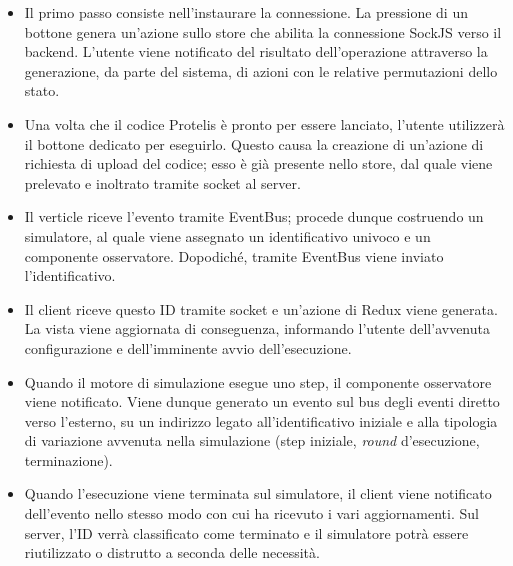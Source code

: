       \begin{itemize}
        \item
          Il primo passo consiste nell'instaurare la connessione.
          La pressione di un bottone genera un'azione sullo store che abilita la connessione SockJS verso il backend.
          L'utente viene notificato del risultato dell'operazione attraverso la generazione, da parte del sistema, di azioni con le relative permutazioni dello stato.
        \item
          Una volta che il codice Protelis è pronto per essere lanciato, l'utente utilizzerà il bottone dedicato per eseguirlo.
          Questo causa la creazione di un'azione di richiesta di upload del codice;
          esso è già presente nello store, dal quale viene prelevato e inoltrato tramite socket al server.
        \item
          Il verticle riceve l'evento tramite EventBus;
          procede dunque costruendo un simulatore, al quale viene assegnato un identificativo univoco e un componente osservatore.
          Dopodiché, tramite EventBus viene inviato l'identificativo.
        \item
          Il client riceve questo ID tramite socket e un'azione di Redux viene generata.
          La vista viene aggiornata di conseguenza, informando l'utente dell'avvenuta configurazione e dell'imminente avvio dell'esecuzione.
        \item
          Quando il motore di simulazione esegue uno step, il componente osservatore viene notificato.
          Viene dunque generato un evento sul bus degli eventi diretto verso l'esterno, su un indirizzo legato all'identificativo iniziale e alla tipologia di variazione avvenuta nella simulazione (step iniziale, \emph{round} d'esecuzione, terminazione).
        \item
          Quando l'esecuzione viene terminata sul simulatore, il client viene notificato dell'evento nello stesso modo con cui ha ricevuto i vari aggiornamenti.
          Sul server, l'ID verrà classificato come terminato e il simulatore potrà essere riutilizzato o distrutto a seconda delle necessità.
      \end{itemize}

